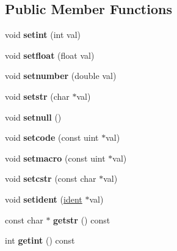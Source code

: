 \subsection*{Public Member Functions}
\begin{DoxyCompactItemize}
\item 
\mbox{\label{structtagval_a029d86c7c0713d121ea6c5465c640a6d}} 
void {\bfseries setint} (int val)
\item 
\mbox{\label{structtagval_a588507abd7dcd640095e6854c6f74d30}} 
void {\bfseries setfloat} (float val)
\item 
\mbox{\label{structtagval_abd447487b2e7b6e0d56afc892a5a5cbe}} 
void {\bfseries setnumber} (double val)
\item 
\mbox{\label{structtagval_a5be3c962cf7714dd08a56592fe15bcad}} 
void {\bfseries setstr} (char $\ast$val)
\item 
\mbox{\label{structtagval_a90a4db3b5877a55419061f56def0499e}} 
void {\bfseries setnull} ()
\item 
\mbox{\label{structtagval_ad7ef28cfd878d51aeb13f58258b7008c}} 
void {\bfseries setcode} (const uint $\ast$val)
\item 
\mbox{\label{structtagval_a85c7076f555434ff4862dff7bdb1386f}} 
void {\bfseries setmacro} (const uint $\ast$val)
\item 
\mbox{\label{structtagval_a3060b86d06f6fde2542e1d3b02304096}} 
void {\bfseries setcstr} (const char $\ast$val)
\item 
\mbox{\label{structtagval_a3e1c114190d96bea50f6a9a2bced6fc2}} 
void {\bfseries setident} (\hyperlink{structident}{ident} $\ast$val)
\item 
\mbox{\label{structtagval_ae6cbace8d42dc9aae83cb42f79306aa6}} 
const char $\ast$ {\bfseries getstr} () const
\item 
\mbox{\label{structtagval_a08f5cf009e089a371791d78cb4ad3517}} 
int {\bfseries getint} () const

\end{DoxyCompactItemize}
